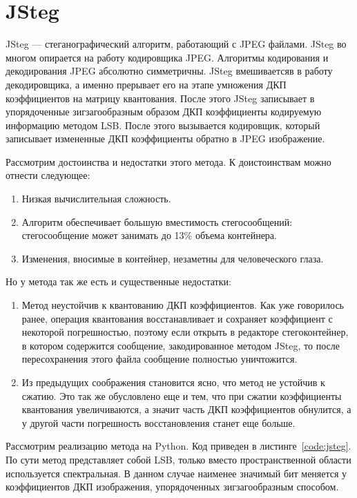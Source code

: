 \section{JSteg}
JSteg --- стеганографический алгоритм, работающий с JPEG файлами.
JSteg во многом опирается на работу кодировщика JPEG. Алгоритмы
кодирования и декодирования JPEG абсолютно симметричны.
JSteg вмешиваетсяв в работу декодировщика, а именно прерывает
его на этапе умножения ДКП коэффициентов на матрицу квантования.
После этого JSteg записывает в упорядоченные зигзагообразным образом
ДКП коэффициенты кодируемую информацию методом LSB. После этого вызывается
кодировщик, который записывает измененные ДКП коэффициенты обратно в JPEG
изображение.

Рассмотрим достоинства и недостатки этого метода.
К доистоинствам можно отнести следующее:
\begin{enumerate}
    \item Низкая вычислительная сложность.
    \item Алгоритм обеспечивает большую вместимость стегосообщений:
    стегосообщение может занимать до 13\% объема контейнера.
    \item Изменения, вносимые в контейнер, незаметны для человеческого глаза.
\end{enumerate}
Но у метода так же есть и существенные недостатки:
\begin{enumerate}
    \item Метод неустойчив к квантованию ДКП коэффициентов.
    Как уже говорилось ранее, операция квантования
    восстанавливает и сохраняет коэффициент с некоторой погрешностью,
    поэтому если открыть в редакторе стегоконтейнер, в котором
    содержится сообщение, закодированное методом JSteg,
    то после пересохранения этого файла сообщение полностью уничтожится. 
    \item Из предыдущих соображения становится ясно, что метод не устойчив
    к сжатию. Это так же обусловлено еще и тем, что при сжатии коэффициенты
    квантования увеличиваются, а значит часть ДКП коэффициентов обнулится,
    а у другой части погрешность восстановления станет еще больше.
\end{enumerate}
Рассмотрим реализацию метода на Python. Код приведен в листинге~\ref{code:jsteg}.
По сути метод представляет собой LSB, только вместо пространственной области
используется спектральная. В данном случае наименее значимый бит меняется
у коэффициентов ДКП изображения, упорядоченных зигзагообразным способом. 


